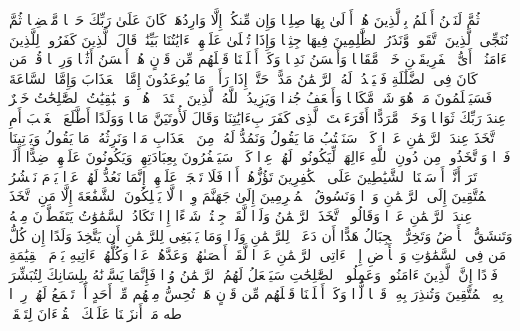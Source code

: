 ثُمَّ لَنَحۡنُ أَعۡلَمُ بِٱلَّذِینَ هُمۡ أَوۡلَىٰ بِهَا صِلِیࣰّا%
\stopbuffer%
\startbuffer[\q:19:71]
وَإِن مِّنكُمۡ إِلَّا وَارِدُهَاۚ كَانَ عَلَىٰ رَبِّكَ حَتۡمࣰا مَّقۡضِیࣰّا%
\stopbuffer%
\startbuffer[\q:19:72]
ثُمَّ نُنَجِّی ٱلَّذِینَ ٱتَّقَوا۟ وَّنَذَرُ ٱلظَّٰلِمِینَ فِیهَا جِثِیࣰّا%
\stopbuffer%
\startbuffer[\q:19:73]
وَإِذَا تُتۡلَىٰ عَلَیۡهِمۡ ءَایَٰتُنَا بَیِّنَٰتࣲ قَالَ ٱلَّذِینَ كَفَرُوا۟ لِلَّذِینَ ءَامَنُوۤا۟ أَیُّ ٱلۡفَرِیقَیۡنِ خَیۡرࣱ مَّقَامࣰا وَأَحۡسَنُ نَدِیࣰّا%
\stopbuffer%
\startbuffer[\q:19:74]
وَكَمۡ أَهۡلَكۡنَا قَبۡلَهُم مِّن قَرۡنٍ هُمۡ أَحۡسَنُ أَثَٰثࣰا وَرِءۡیࣰا%
\stopbuffer%
\startbuffer[\q:19:75]
قُلۡ مَن كَانَ فِی ٱلضَّلَٰلَةِ فَلۡیَمۡدُدۡ لَهُ ٱلرَّحۡمَٰنُ مَدًّاۚ حَتَّىٰۤ إِذَا رَأَوۡا۟ مَا یُوعَدُونَ إِمَّا ٱلۡعَذَابَ وَإِمَّا ٱلسَّاعَةَ فَسَیَعۡلَمُونَ مَنۡ هُوَ شَرࣱّ مَّكَانࣰا وَأَضۡعَفُ جُندࣰا%
\stopbuffer%
\startbuffer[\q:19:76]
وَیَزِیدُ ٱللَّهُ ٱلَّذِینَ ٱهۡتَدَوۡا۟ هُدࣰىۗ وَٱلۡبَٰقِیَٰتُ ٱلصَّٰلِحَٰتُ خَیۡرٌ عِندَ رَبِّكَ ثَوَابࣰا وَخَیۡرࣱ مَّرَدًّا%
\stopbuffer%
\startbuffer[\q:19:77]
أَفَرَءَیۡتَ ٱلَّذِی كَفَرَ بِءَایَٰتِنَا وَقَالَ لَأُوتَیَنَّ مَالࣰا وَوَلَدًا%
\stopbuffer%
\startbuffer[\q:19:78]
أَطَّلَعَ ٱلۡغَیۡبَ أَمِ ٱتَّخَذَ عِندَ ٱلرَّحۡمَٰنِ عَهۡدࣰا%
\stopbuffer%
\startbuffer[\q:19:79]
كَلَّاۚ سَنَكۡتُبُ مَا یَقُولُ وَنَمُدُّ لَهُۥ مِنَ ٱلۡعَذَابِ مَدࣰّا%
\stopbuffer%
\startbuffer[\q:19:80]
وَنَرِثُهُۥ مَا یَقُولُ وَیَأۡتِینَا فَرۡدࣰا%
\stopbuffer%
\startbuffer[\q:19:81]
وَٱتَّخَذُوا۟ مِن دُونِ ٱللَّهِ ءَالِهَةࣰ لِّیَكُونُوا۟ لَهُمۡ عِزࣰّا%
\stopbuffer%
\startbuffer[\q:19:82]
كَلَّاۚ سَیَكۡفُرُونَ بِعِبَادَتِهِمۡ وَیَكُونُونَ عَلَیۡهِمۡ ضِدًّا%
\stopbuffer%
\startbuffer[\q:19:83]
أَلَمۡ تَرَ أَنَّاۤ أَرۡسَلۡنَا ٱلشَّیَٰطِینَ عَلَى ٱلۡكَٰفِرِینَ تَؤُزُّهُمۡ أَزࣰّا%
\stopbuffer%
\startbuffer[\q:19:84]
فَلَا تَعۡجَلۡ عَلَیۡهِمۡۖ إِنَّمَا نَعُدُّ لَهُمۡ عَدࣰّا%
\stopbuffer%
\startbuffer[\q:19:85]
یَوۡمَ نَحۡشُرُ ٱلۡمُتَّقِینَ إِلَى ٱلرَّحۡمَٰنِ وَفۡدࣰا%
\stopbuffer%
\startbuffer[\q:19:86]
وَنَسُوقُ ٱلۡمُجۡرِمِینَ إِلَىٰ جَهَنَّمَ وِرۡدࣰا%
\stopbuffer%
\startbuffer[\q:19:87]
لَّا یَمۡلِكُونَ ٱلشَّفَٰعَةَ إِلَّا مَنِ ٱتَّخَذَ عِندَ ٱلرَّحۡمَٰنِ عَهۡدࣰا%
\stopbuffer%
\startbuffer[\q:19:88]
وَقَالُوا۟ ٱتَّخَذَ ٱلرَّحۡمَٰنُ وَلَدࣰا%
\stopbuffer%
\startbuffer[\q:19:89]
لَّقَدۡ جِئۡتُمۡ شَیۡءًا إِدࣰّا%
\stopbuffer%
\startbuffer[\q:19:90]
تَكَادُ ٱلسَّمَٰوَٰتُ یَتَفَطَّرۡنَ مِنۡهُ وَتَنشَقُّ ٱلۡأَرۡضُ وَتَخِرُّ ٱلۡجِبَالُ هَدًّا%
\stopbuffer%
\startbuffer[\q:19:91]
أَن دَعَوۡا۟ لِلرَّحۡمَٰنِ وَلَدࣰا%
\stopbuffer%
\startbuffer[\q:19:92]
وَمَا یَنۢبَغِی لِلرَّحۡمَٰنِ أَن یَتَّخِذَ وَلَدًا%
\stopbuffer%
\startbuffer[\q:19:93]
إِن كُلُّ مَن فِی ٱلسَّمَٰوَٰتِ وَٱلۡأَرۡضِ إِلَّاۤ ءَاتِی ٱلرَّحۡمَٰنِ عَبۡدࣰا%
\stopbuffer%
\startbuffer[\q:19:94]
لَّقَدۡ أَحۡصَىٰهُمۡ وَعَدَّهُمۡ عَدࣰّا%
\stopbuffer%
\startbuffer[\q:19:95]
وَكُلُّهُمۡ ءَاتِیهِ یَوۡمَ ٱلۡقِیَٰمَةِ فَرۡدًا%
\stopbuffer%
\startbuffer[\q:19:96]
إِنَّ ٱلَّذِینَ ءَامَنُوا۟ وَعَمِلُوا۟ ٱلصَّٰلِحَٰتِ سَیَجۡعَلُ لَهُمُ ٱلرَّحۡمَٰنُ وُدࣰّا%
\stopbuffer%
\startbuffer[\q:19:97]
فَإِنَّمَا یَسَّرۡنَٰهُ بِلِسَانِكَ لِتُبَشِّرَ بِهِ ٱلۡمُتَّقِینَ وَتُنذِرَ بِهِۦ قَوۡمࣰا لُّدࣰّا%
\stopbuffer%
\startbuffer[\q:19:98]
وَكَمۡ أَهۡلَكۡنَا قَبۡلَهُم مِّن قَرۡنٍ هَلۡ تُحِسُّ مِنۡهُم مِّنۡ أَحَدٍ أَوۡ تَسۡمَعُ لَهُمۡ رِكۡزَۢا%
\stopbuffer%
\startbuffer[\q:20:1]
طه%
\stopbuffer%
\startbuffer[\q:20:2]
مَاۤ أَنزَلۡنَا عَلَیۡكَ ٱلۡقُرۡءَانَ لِتَشۡقَىٰۤ%
\stopbuffer%
